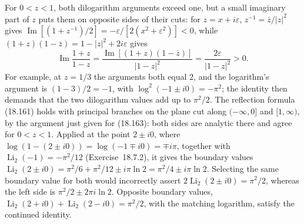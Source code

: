   For
$0<z<1$, both dilogarithm arguments exceed one, but a small
imaginary part of $z$ puts them on opposite sides of their cuts:
for $z=x+i\varepsilon$, $z^{-1}=\bar z/|z|^2$ gives
$\operatorname{Im}[(1+z^{-1})/2]
=-\varepsilon/[2(x^2+\varepsilon^2)]<0$, while
$(1+z)(1-\bar z)=1-|z|^2+2i\varepsilon$ gives
\[
\operatorname{Im}\frac{1+z}{1-z}
 =\frac{\operatorname{Im}[(1+z)(1-\bar z)]}{|1-z|^2}
 =\frac{2\varepsilon}{|1-z|^2}>0.
\]
For example, at $z=1/3$ the arguments both equal $2$, and the
logarithm's argument is $(1-3)/2=-1$, with $\log^2(-1\pm i0)=-\pi^2$;
the identity then demands that the two dilogarithm values add up to
$\pi^2/2$.  The reflection formula (18.161) holds with principal
branches on the plane cut along $(-\infty,0]$ and $[1,\infty)$, by
the argument just given for (18.163): both sides are analytic there
and agree for $0<z<1$.  Applied at the point $2\pm i0$, where
$\log(1-(2\pm i0))=\log(-1\mp i0)=\mp i\pi$,
together with $\operatorname{Li}_2(-1)=-\pi^2/12$
(Exercise~18.7.2), it gives the boundary values
$\operatorname{Li}_2(2\pm i0)=\pi^2/6+\pi^2/12\pm i\pi\ln2
=\pi^2/4\pm i\pi\ln2$.
Selecting the same boundary value for both would incorrectly
assert $2\operatorname{Li}_2(2\pm i0)=\pi^2/2$, whereas the left
side is $\pi^2/2\pm2\pi i\ln2$.  Opposite boundary
values, $\operatorname{Li}_2(2+i0)+\operatorname{Li}_2(2-i0)
=\pi^2/2$, with the matching logarithm, satisfy the continued
identity.

